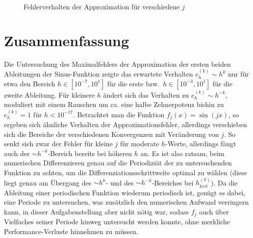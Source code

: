 \documentclass[smallheadings]{scrartcl}
\begin{document}
\begin{figure}[H]
\caption{Fehlerverhalten der Approximation für verschiedene $j$}
\label{im:errplot_j}


\end{figure}



\section{Zusammenfassung}

Die Untersuchung des Maximalfehlers der Approximation der ersten beiden Ableitungen der Sinus-Funktion zeigte das erwartete Verhalten $e_h^{(k)}\sim h^{k}$ nur für etwa den Bereich $h\in\left[10^{-7},10^1\right]$ für die erste bzw.~$h\in\left[10^{-3},10^1\right]$ für die zweite Ableitung. Für kleinere $h$ ändert sich das Verhalten zu $e_h^{(k)}\sim h^{-k}$, moduliert mit einem Rauschen um ca. eine halbe Zehnerpotenz bishin zu $e_h^{(k)}=1$ für $h<10^{-17}$. Betrachtet man die Funktion $f_j(x)=\sin(jx)$, so ergeben sich ähnliche Verhalten der Approximationsfehler, allerdings verschieben sich die Bereiche der verschiedenen Konvergenzen mit Veränderung von $j$. So senkt sich zwar der Fehler für kleine $j$ für moderate  $h$-Werte, allerdings fängt auch der $\sim h^{-k}$-Bereich bereits bei höheren $h$ an. Es ist also ratsam, beim numerischen Differenzieren genau auf die Periodiziät der zu untersuchenden Funktion zu achten, um die Differenziationsschrittweite optimal zu wählen (diese liegt genau am Übergang des $\sim h^k$- und des $\sim h^{-k}$-Bereiches bei $h_{krit}^{(k)}$). Da die Ableitung einer periodischen Funktion wiederum periodisch ist, genügt es dabei, eine Periode zu untersuchen, was zusätzlich den numerischen Aufwand verringern kann, in dieser Aufgabenstellung aber nicht nötig war, sodass $f_j$ auch über Vielfaches seiner Periode hinweg untersucht werden konnte, ohne merkliche Performance-Verluste hinnehmen zu müssen.


\end{document}
